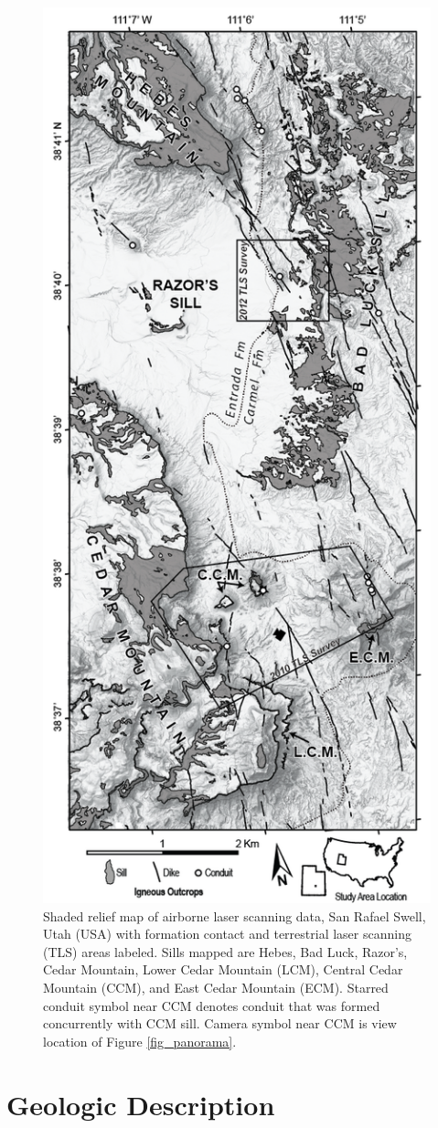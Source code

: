 \documentclass[12pt,letter]{article}
\begin{document}
\begin{figure}
\centering
\includegraphics[width=0.4\linewidth]{figures/Fig1-map}
\caption{Shaded relief map of airborne laser scanning data, San Rafael Swell, Utah (USA) with formation contact and terrestrial laser scanning (TLS) areas labeled. Sills mapped are Hebes, Bad Luck, Razor’s, Cedar Mountain, Lower Cedar Mountain (LCM), Central Cedar Mountain (CCM), and East Cedar Mountain (ECM). Starred conduit symbol near CCM denotes conduit that was formed concurrently with CCM sill. Camera symbol near CCM is view location of Figure \ref{fig_panorama}.}
\label{fig_map}
\end{figure}

\section{Geologic Description}
\end{document}

